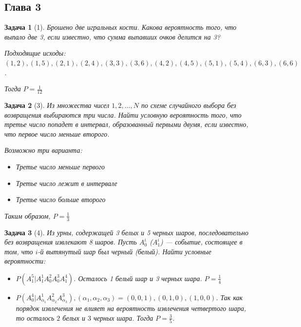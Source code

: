 \documentclass{article}
\theoremstyle{problemstyle}
\newtheorem{problem}{Задача}[section]
\begin{document}
\subsection{Глава 3}
\begin{problem}[1]
    Брошено две игральных кости. Какова вероятность того, что
    выпало две 3, если известно, что сумма выпавших очков делится на 3?

    Подходящие исходы: $ (1, 2), (1, 5), (2, 1), (2, 4), (3, 3), (3, 6), (4, 2), (4, 5), (5, 1), (5, 4), (6, 3), (6, 6) $.

    Тогда $P = \frac{1}{12}$
\end{problem}

\begin{problem}[3]
    Из множества чисел ${1, 2, \ldots, N}$ по схеме случайного выбора
    без возвращения выбираются три числа. Найти условную вероятность того,
    что третье число попадет в интервал, образованный первыми двумя,
    если известно, что первое число меньше второго.

    Возможно три варианта:
    \begin{itemize}
        \item Третье число меньше первого
        \item Третье число лежит в интервале
        \item Третье число больше второго
    \end{itemize}

    Таким образом, $P = \frac{1}{3}$
\end{problem}


\begin{problem}[4]
    Из урны, содержащей 3 белых и 5 черных шаров, последовательно
    без возвращения извлекают 8 шаров. Пусть $A_0^i$ ($A_1^i$) --- событие,
    состоящее в том, что $i$-й вытянутый шар был черный (белый).
    Найти условные вероятности:
    
    \begin{itemize}
        \item $P(A_1^5 | A_1^1 A_0^2 A_0^3 A_1^4)$.
            Осталось 1 белый шар и 3 черных шара. $P = \frac{1}{4}$
        \item $P(A_0^4 | A_{\alpha_1}^1 A_{\alpha_2}^2 A_{\alpha_3}^3), (\alpha_1, \alpha_2, \alpha_3) = (0, 0, 1), (0, 1, 0), (1, 0, 0)$.
            Так как порядок извлечения не влияет на вероятность извлечения четвертого шара,
            то осталось $2$ белых и $3$ черных шара. Тогда $P = \frac{3}{5}$.
    \end{itemize}
\end{problem}
\end{document}

